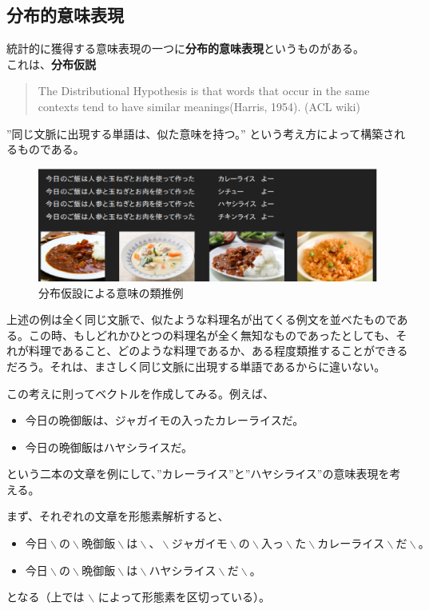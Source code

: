 \subsection{分布的意味表現}
統計的に獲得する意味表現の一つに\textbf{分布的意味表現}というものがある。\\
これは、\textbf{分布仮説}
\begin{quote}
  The Distributional Hypothesis is that words that occur in the same contexts tend to have similar meanings(Harris, 1954). (ACL wiki)
\end{quote}
”同じ文脈に出現する単語は、似た意味を持つ。”
という考え方によって構築されるものである。\cite{JRFirth}

\begin{figure}[h]
  \centering
  \includegraphics[width=15cm]{../images/kyou_gohan.eps}
  \caption{分布仮設による意味の類推例}
\end{figure}

上述の例は全く同じ文脈で、似たような料理名が出てくる例文を並べたものである。この時、もしどれかひとつの料理名が全く無知なものであったとしても、それが料理であること、どのような料理であるか、ある程度類推することができるだろう。それは、まさしく同じ文脈に出現する単語であるからに違いない。

この考えに則ってベクトルを作成してみる。例えば、
\begin{itemize}
  \item 今日の晩御飯は、ジャガイモの入ったカレーライスだ。
  \item 今日の晩御飯はハヤシライスだ。
\end{itemize}
という二本の文章を例にして、”カレーライス”と”ハヤシライス”の意味表現を考える。

まず、それぞれの文章を形態素解析すると、
\begin{itemize}
  \item $今日 \backslash の \backslash 晩御飯 \backslash は \backslash 、 \backslash ジャガイモ \backslash の \backslash 入っ \backslash た \backslash カレーライス \backslash だ \backslash 。$
  \item $今日 \backslash の \backslash 晩御飯 \backslash は \backslash ハヤシライス \backslash だ \backslash 。$
\end{itemize}
となる（上では $\backslash$ によって形態素を区切っている）。

